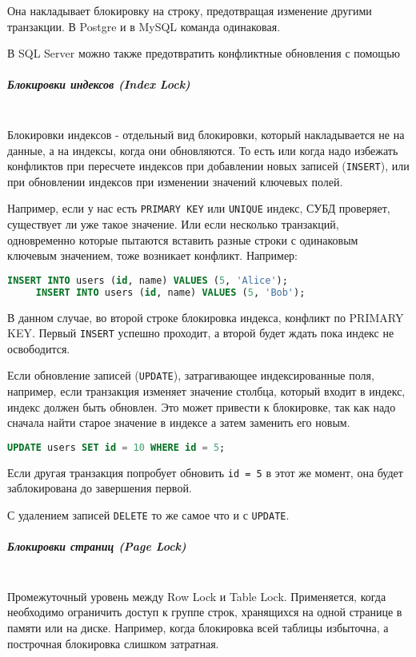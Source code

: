  Она накладывает блокировку на строку, предотвращая изменение другими транзакции. В Postgre и в MySQL команда одинаковая.

 В SQL Server можно также предотвратить конфликтные обновления с помощью \texttt{} \autocite{MicrosoftLearnSQLserverTabHints}
 
 \subparagraph{Блокировки индексов (Index Lock)} ~\\

 Блокировки индексов - отдельный вид блокировки, который накладывается не на данные, а на индексы, когда они обновляются. То есть или когда надо избежать конфликтов при пересчете индексов при добавлении новых записей (\texttt{INSERT}), или при обновлении индексов при изменении значений ключевых полей.
 
 Например, если у нас есть \texttt{PRIMARY KEY} или \texttt{UNIQUE} индекс, СУБД проверяет, существует ли уже такое значение. Или если несколько транзакций, одновременно которые пытаются вставить разные строки с одинаковым ключевым значением, тоже возникает конфликт. Например:
 \begin{lstlisting}[language=SQL]
     INSERT INTO users (id, name) VALUES (5, 'Alice');
     INSERT INTO users (id, name) VALUES (5, 'Bob');
 \end{lstlisting}

 В данном случае, во второй строке блокировка индекса, конфликт по PRIMARY KEY. Первый \texttt{INSERT} успешно проходит, а второй будет ждать пока индекс не освободится.
 
 Если обновление записей (\texttt{UPDATE}), затрагивающее индексированные поля, например, если транзакция изменяет значение столбца, который входит в индекс, индекс должен быть обновлен. Это может привести к блокировке, так как надо сначала найти старое значение в индексе а затем заменить его новым.
 \begin{lstlisting}[language=SQL]
     UPDATE users SET id = 10 WHERE id = 5;
 \end{lstlisting}

 Если другая транзакция попробует обновить \texttt{id = 5} в этот же момент, она будет заблокирована до завершения первой.
 
 С удалением записей \texttt{DELETE} то же самое что и с \texttt{UPDATE}.
 
 \subparagraph{Блокировки страниц (Page Lock)} ~\\

 Промежуточный уровень между Row Lock и Table Lock. Применяется, когда необходимо ограничить доступ к группе строк, хранящихся на одной странице в памяти или на диске. Например, когда блокировка всей таблицы избыточна, а построчная блокировка слишком затратная.
 
